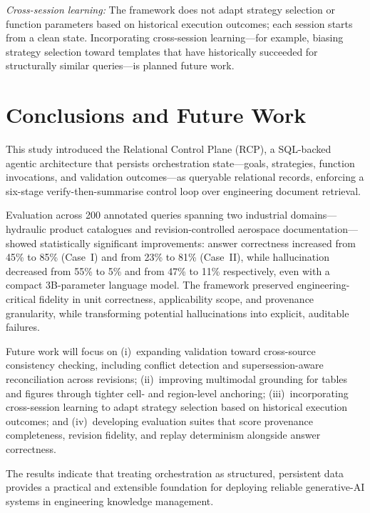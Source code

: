 \documentclass[largeformat]{interact}
\begin{document}
    \noindent \textit{Cross-session learning:} The framework does not adapt strategy selection or function parameters based on historical execution outcomes; each session starts from a clean state. Incorporating cross-session learning---for example, biasing strategy selection toward templates that have historically succeeded for structurally similar queries---is planned future work.


\section{Conclusions and Future Work}
\label{sec:conclusions_and_future_work}
This study introduced the Relational Control Plane (RCP), a SQL-backed agentic architecture that persists orchestration state---goals, strategies, function invocations, and validation outcomes---as queryable relational records, enforcing a six-stage verify-then-summarise control loop over engineering document retrieval.

Evaluation across 200 annotated queries spanning two industrial domains---hydraulic product catalogues and revision-controlled aerospace documentation---showed statistically significant improvements: answer correctness increased from 45\% to 85\% (Case~I) and from 23\% to 81\% (Case~II), while hallucination decreased from 55\% to 5\% and from 47\% to 11\% respectively, even with a compact 3B-parameter language model. The framework preserved engineering-critical fidelity in unit correctness, applicability scope, and provenance granularity, while transforming potential hallucinations into explicit, auditable failures.

Future work will focus on (i)~expanding validation toward cross-source consistency checking, including conflict detection and supersession-aware reconciliation across revisions; (ii)~improving multimodal grounding for tables and figures through tighter cell- and region-level anchoring; (iii)~incorporating cross-session learning to adapt strategy selection based on historical execution outcomes; and (iv)~developing evaluation suites that score provenance completeness, revision fidelity, and replay determinism alongside answer correctness.

The results indicate that treating orchestration as structured, persistent data provides a practical and extensible foundation for deploying reliable generative-AI systems in engineering knowledge management.
\end{document}
